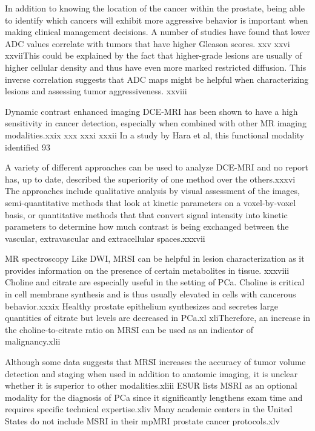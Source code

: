  In addition to knowing the location of the cancer within the prostate, being able to identify which cancers will exhibit more aggressive behavior is important when making clinical management decisions. A number of studies have found that lower ADC values correlate with tumors that have higher Gleason scores. xxv xxvi xxviiThis could be explained by the fact that higher-grade lesions are usually of higher cellular density and thus have even more marked restricted diffusion. This inverse correlation suggests that ADC maps might be helpful when characterizing lesions and assessing tumor aggressiveness. xxviii 

 Dynamic contrast enhanced imaging
 DCE-MRI has been shown to have a high sensitivity in cancer detection, especially when combined with other MR imaging modalities.xxix xxx xxxi xxxii In a study by Hara et al, this functional modality identified 93%

 A variety of different approaches can be used to analyze DCE-MRI and no report has, up to date, described the superiority of one method over the others.xxxvi The approaches include qualitative analysis by visual assessment of the images, semi-quantitative methods that look at kinetic parameters on a voxel-by-voxel basis, or quantitative methods that that convert signal intensity into kinetic parameters to determine how much contrast is being exchanged between the vascular, extravascular and extracellular spaces.xxxvii 
    
    MR spectroscopy
    Like DWI, MRSI can be helpful in lesion characterization as it provides information on the presence of certain metabolites in tissue. xxxviii Choline and citrate are especially useful in the setting of PCa. Choline is critical in cell membrane synthesis and is thus usually elevated in cells with cancerous behavior.xxxix Healthy prostate epithelium synthesizes and secretes large quantities of citrate but levels are decreased in PCa.xl xliTherefore, an increase in the choline-to-citrate ratio on MRSI can be used as an indicator of malignancy.xlii 

    Although some data suggests that MRSI increases the accuracy of tumor volume detection and staging when used in addition to anatomic imaging, it is unclear whether it is superior to other modalities.xliii ESUR lists MSRI as an optional modality for the diagnosis of PCa since it significantly lengthens exam time and requires specific technical expertise.xliv Many academic centers in the United States do not include MSRI in their mpMRI prostate cancer protocols.xlv 
